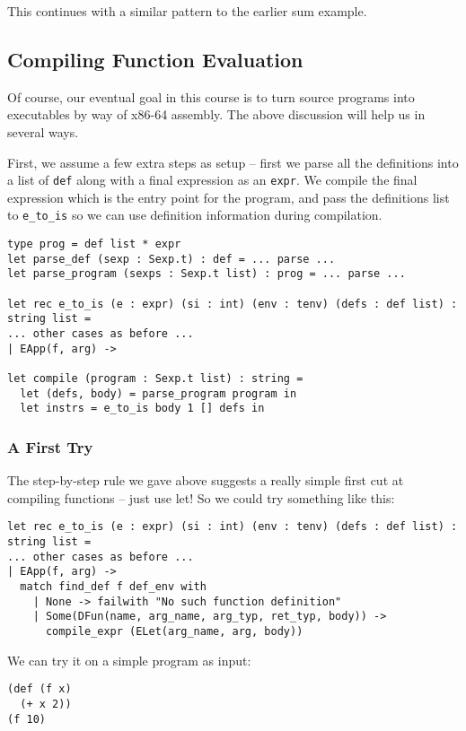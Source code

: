 \documentclass[10pt, oneside]{article}
\begin{document}
This continues with a similar pattern to the earlier sum example.

\subsection*{Compiling Function Evaluation}

Of course, our eventual goal in this course is to turn source programs into
executables by way of x86-64 assembly. The above discussion will help us in
several ways.

First, we assume a few extra steps as setup -- first we parse all the
definitions into a list of \texttt{def} along with a final expression as an
\texttt{expr}. We compile the final expression which is the entry point for
the program, and pass the definitions list to \texttt{e\_to\_is} so we can
use definition information during compilation.

\begin{lstlisting}
type prog = def list * expr
let parse_def (sexp : Sexp.t) : def = ... parse ...
let parse_program (sexps : Sexp.t list) : prog = ... parse ...

let rec e_to_is (e : expr) (si : int) (env : tenv) (defs : def list) : string list =
... other cases as before ...
| EApp(f, arg) ->

let compile (program : Sexp.t list) : string =
  let (defs, body) = parse_program program in
  let instrs = e_to_is body 1 [] defs in
\end{lstlisting}

\subsubsection*{A First Try}

The step-by-step rule we gave above suggests a really simple first cut at
compiling functions -- just use let! So we could try something like this:

\begin{lstlisting}
let rec e_to_is (e : expr) (si : int) (env : tenv) (defs : def list) : string list =
... other cases as before ...
| EApp(f, arg) ->
  match find_def f def_env with
    | None -> failwith "No such function definition"
    | Some(DFun(name, arg_name, arg_typ, ret_typ, body)) ->
      compile_expr (ELet(arg_name, arg, body))
\end{lstlisting}


We can try it on a simple program as input:

\begin{lstlisting}
(def (f x)
  (+ x 2))
(f 10)
\end{lstlisting}
\end{document}
